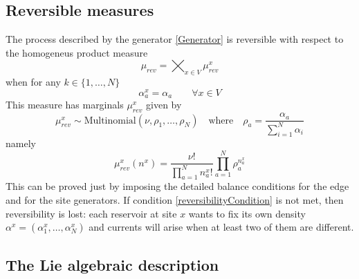 \documentclass[11pt]{article}
\numberwithin{equation}{section}
\numberwithin{equation}{subsection}
\newcommand{\twoj}{\nu}
\begin{document}
\subsection{Reversible measures}
The process described by the generator \eqref{Generator} is reversible with respect to the homogeneus product measure \begin{equation}\label{reversibleMeasure}
\mu_{rev}=\bigtimes_{x\in V}\mu_{rev}^{x}
\end{equation}
when for any $k\in\{1,\ldots,N\}$
\begin{equation}\label{reversibilityCondition}
\alpha_{a}^{x}=\alpha_{a}\qquad \forall x\in V
\end{equation}
This measure has marginals $\mu_{rev}^{x}$ given by 
\begin{equation}
 \mu^{x}_{rev}\sim \text{Multinomial}\left(\twoj,\rho_{1},\ldots,\rho_{N}\right)\quad \text{where}\quad \rho_{a}=\frac{\alpha_{a}}{\sum_{i=1}^{N}\alpha_{i}}
\end{equation}
namely
\begin{equation}
\mu_{rev}^{x}(n^{x})=\frac{\nu!}{\prod_{a=1}^{N}n_{a}^{x}!}\prod_{a=1}^{N}\rho_{a}^{n_{a}^{x}}
\end{equation}
This can be proved just by imposing the detailed balance conditions for the edge and for the site generators. If condition \eqref{reversibilityCondition} is not met, then reversibility is lost: each reservoir at site $x$ wants to fix its own density $\alpha^{x}=(\alpha_{1}^{x},\ldots,\alpha_{N}^{x})$ and currents will arise when at least two of them are different. 
\subsection{The Lie algebraic description}
\end{document}
